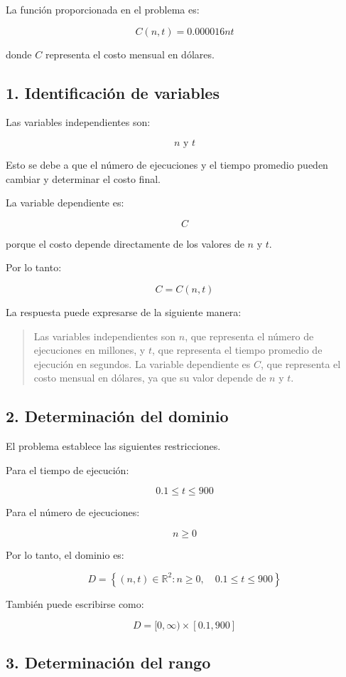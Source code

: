 \documentclass[12pt,a4paper]{article}
\begin{document}
La función proporcionada en el problema es:

\[\boxed{C(n,t)=0.000016nt}\]

donde $C$ representa el costo mensual en dólares.


\subsection{1. Identificación de variables}

Las variables independientes son:

\[\boxed{n \text{ y } t}\]

Esto se debe a que el número de ejecuciones y el tiempo promedio
pueden cambiar y determinar el costo final.

La variable dependiente es:

\[\boxed{C}\]

porque el costo depende directamente de los valores de $n$ y $t$.

Por lo tanto:

\[\boxed{C=C(n,t)}\]

La respuesta puede expresarse de la siguiente manera:

\begin{quote}
Las variables independientes son $n$, que representa el número de
ejecuciones en millones, y $t$, que representa el tiempo promedio
de ejecución en segundos. La variable dependiente es $C$, que
representa el costo mensual en dólares, ya que su valor depende
de $n$ y $t$.
\end{quote}


\subsection{2. Determinación del dominio}

El problema establece las siguientes restricciones.

Para el tiempo de ejecución:

\[0.1\leq t\leq900\]

Para el número de ejecuciones:

\[n\geq0\]

Por lo tanto, el dominio es:

\[\boxed{D=\left\{(n,t)\in\mathbb{R}^2:n\geq0,\quad0.1\leq t\leq900\right\}}\]

También puede escribirse como:

\[\boxed{D=[0,\infty)\times[0.1,900]}\]


\subsection{3. Determinación del rango}
\end{document}
